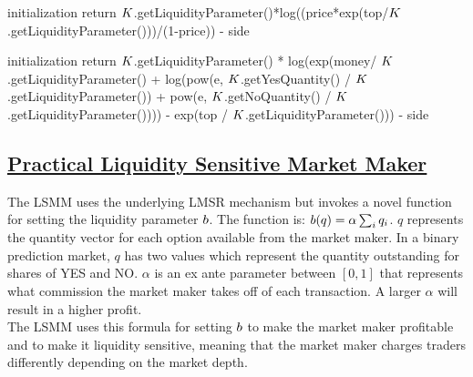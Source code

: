 \begin{algorithm}[H]
\SetAlgoLined
{}
initialization\;
return $K$.getLiquidityParameter()*log((price*exp(top/$K$.getLiquidityParameter()))/(1-price)) - side\;
\end{algorithm}

\begin{algorithm}[H]
\SetAlgoLined
{}
initialization\;
return $K$.getLiquidityParameter() * log(exp(money/ $K$.getLiquidityParameter() + log(pow(e, $K$.getYesQuantity() / $K$.getLiquidityParameter()) + pow(e, $K$.getNoQuantity() / $K$.getLiquidityParameter()))) - exp(top / $K$.getLiquidityParameter())) - side\;
\end{algorithm}

\subsection{\href{https://www.cs.cmu.edu/~sandholm/liquidity-sensitive automated market maker.teac.pdf}{Practical Liquidity Sensitive Market Maker}}
The LSMM uses the underlying LMSR mechanism but invokes a novel
function for setting the liquidity parameter $b$. The function is:
$b(q) = \alpha \sum_{i} q_i$. $q$ represents the quantity vector
for each option available from the market maker. In a binary
prediction market, $q$ has two values which represent the quantity
outstanding for shares of YES and NO. $\alpha$ is an ex ante parameter 
between $[0,1]$ that represents what commission the market maker takes
off of each transaction. A larger $\alpha$ will result in a higher
profit.\\

The LSMM uses this formula for setting $b$ to make the market
maker profitable and to make it liquidity sensitive, meaning that
the market maker charges traders differently depending on the market
depth. \\

